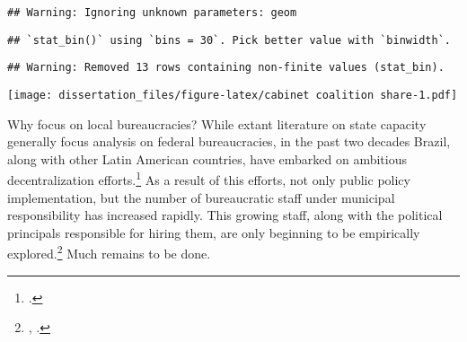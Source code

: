 \documentclass[12pt,]{book}
\let\rmarkdownfootnote\footnote%
\def\footnote{\protect\rmarkdownfootnote}
\begin{document}
\begin{verbatim}
## Warning: Ignoring unknown parameters: geom
\end{verbatim}

\begin{verbatim}
## `stat_bin()` using `bins = 30`. Pick better value with `binwidth`.
\end{verbatim}

\begin{verbatim}
## Warning: Removed 13 rows containing non-finite values (stat_bin).
\end{verbatim}

\texttt{[image: dissertation\_files/figure-latex/cabinet coalition share-1.pdf]}

Why focus on local bureaucracies? While extant literature on state capacity generally focus analysis on federal bureaucracies, in the past two decades Brazil, along with other Latin American countries, have embarked on ambitious decentralization efforts.\footnote{\citet{falleti_decentralization_2010}.} As a result of this efforts, not only public policy implementation, but the number of bureaucratic staff under municipal responsibility has increased rapidly. This growing staff, along with the political principals responsible for hiring them, are only beginning to be empirically explored.\footnote{\citet{colonnelli_patronage_2017}, \citet{brollo_victor_2017}.} Much remains to be done.
\end{document}
